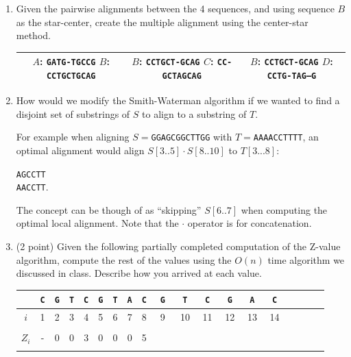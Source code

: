 \documentclass[11pt, oneside]{article}   	%
\begin{document}
\begin{enumerate}
\begin{center}
\end{center}
 
\clearpage
\item Given the pairwise alignments between the 4 sequences, and using sequence $B$ as the star-center, create the multiple alignment using the center-star method. \\
\begin{center}
\begin{tabular}{|c|c|c|}
\hline
\makecell{$A$: \texttt{GATG-TGCCG} \\
$B$: \texttt{CCTGCTGCAG}}&

\makecell{$B$: \texttt{CCTGCT-GCAG}\\
$C$: \texttt{CC-GCTAGCAG} } &


\makecell{$B$: \texttt{CCTGCT-GCAG}\\
$D$: \texttt{CCTG-TAG--G}}\\
\hline
\end{tabular}
\end{center}

\clearpage
\item How would we modify the Smith-Waterman algorithm if we wanted to find a disjoint set of substrings of $S$ to align to a substring of $T$.

For example when aligning $S=$\texttt{GG{\color{red}AGC}GG{\color{blue}CTT}GG} with $T=$\texttt{AAAACCTTTT}, an optimal alignment would align $S[3..5]\cdot S[8..10]$ to $T[3...8]$:
\begin{center}
\texttt{{\color{red}AGC}{\color{blue}CTT}}\\
\texttt{AACCTT}.
\end{center}
The concept can be though of as ``skipping'' $S[6..7]$ when computing the optimal local alignment. 
Note that the $\cdot$ operator is for concatenation. 


 \clearpage
 \item (2 point) Given the following partially completed computation of the Z-value algorithm, compute the rest of the values using the $O(n)$ time algorithm we discussed in class.
Describe how you arrived at each value. 
\vspace{3em}
\noindent
\begin{center}
\begin{tabular}{c||c|c|c|c|c|c|c|c|c|c|c|c|c|c|c|c|c|c|}
& \texttt{C} &  \texttt{G} &  \texttt{T} &  \texttt{C} &  \texttt{G} &  \texttt{T} &  \texttt{A} &  \texttt{C} &  \texttt{G} &  \texttt{T} &  \texttt{C} &  \texttt{G} &  \texttt{A} &  \texttt{C}
\\
\hline
$i$ & 1 & 2 & 3 & 4 & 5 & 6 & 7 & 8 & 9 & 10 & 11 & 12 & 13 & 14\\
\hline
 & & & & & & & & & & & & & &\\
$Z_i$ &\Huge - & \Huge 0 & \Huge 0 & \Huge 3 & \Huge 0 & \Huge 0 & \Huge 0 & \Huge 5 & \Huge ~ ~ & \Huge ~ ~ & \Huge ~ ~ & \Huge ~ ~ & \Huge ~ ~ & \Huge ~ ~ \\
 & & & & & & & & & & & & & &\\
\hline
\end{tabular}
\end{center}


\end{enumerate}
\end{document}
